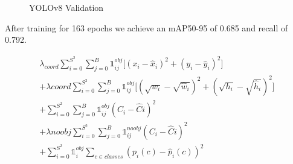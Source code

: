 \documentclass[10pt,twocolumn,letterpaper]{article}
\begin{document}
\begin{figure}[h]
    \centering
    \qquad
    \caption{YOLOv8 Validation}%
    \label{fig:Model_Evaluation}
\end{figure}


After training for 163 epochs we achieve an mAP50-95 of 0.685 and recall of 0.792.

\begin{multline}
\lambda_{coord}\sum_{i=0}^{S^2}\sum_{j=0}^{B}\mathbf{1}_{ij}^{obj}\Big[(x_i-\hat{x}_i)^2+(y_i-\hat{y}_i)^2\Big] \\ + \lambda{coord}\sum_{i=0}^{S^2}\sum_{j=0}^{B}\mathds{1}_{ij}^{obj}\Big[(\sqrt{w_i}-\sqrt{\hat{w}_i})^2+(\sqrt{h_i}-\sqrt{\hat{h}_i})^2\Big]\\
+\sum_{i=0}^{S^2}\sum_{j=0}^{B}\mathds{1}_{ij}^{obj}(C_i-\hat{C}i)^2\\
+\lambda{noobj}\sum_{i=0}^{S^2}\sum_{j=0}^{B}\mathds{1}_{ij}^{noobj}(C_i-\hat{C}i)^2\\
+\sum_{i=0}^{S^2}\mathds{1}_{i}^{obj}\sum_{c\in classes}(p_i(c)-\hat{p}_i(c))^2
\end{multline}
	  
\end{document}
